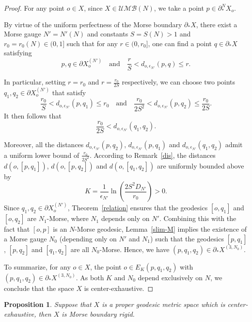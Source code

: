 \documentclass[a4paper,11pt,oneside]{article}
\newtheorem{Proposition}[Theorem]{Proposition}
\begin{document}
\begin{proof}

For any point $o\in X$, since $X\in\mathcal{UMB}(N)$, we take a point $p\in \partial_*^{N}X_o$.

By virtue of the uniform perfectness of the Morse boundary $\partial_* X$, there exist a Morse gauge $N'=N'(N)$ and constants $S=S(N)> 1$ and $r_0=r_0(N)\in (0, 1]$ such that for any $r\in (0, r_0]$, one can find a point $q\in \partial_* X$ satisfying
\[
p, q\in \partial X^{(N')}_o \quad \text{and} \quad \frac{r}{S}<d_{o,\epsilon_{N'}}(p,q)\le r.
\]

In particular, setting $r=r_0$ and $\displaystyle r=\frac{r_0}{2S}$ respectively, we can choose two points $q_1, q_2\in \partial X^{(N')}_o$ that satisfy
\[
\frac{r_0}{S}<d_{o,\epsilon_{N'}}(p,q_1)\le r_0\quad\text{and}\quad
\frac{r_0}{2S^2}<d_{o,\epsilon_{N'}}(p,q_2)\le \frac{r_0}{2S}.
\]
It then follows that
\[
\frac{r_0}{2S}<d_{o,\epsilon_{N'}}(q_1,q_2).
\]

Moreover, all the distances $d_{o,\epsilon_{N'}}(p,q_2)$, $d_{o,\epsilon_{N'}}(p,q_1)$ and $d_{o,\epsilon_{N'}}(q_1,q_2)$ admit a uniform lower bound of $\displaystyle\frac{r_0}{2S^2}$.
According to Remark~\ref{dis}, the distances $d(o, [p, q_1])$, $d(o, [p, q_2])$ and $d(o, [q_1, q_2])$ are uniformly bounded above by
\[
K=\frac{1}{\epsilon_{N'}}\ln\left(\frac{2S^2D_{N'}}{r_0}\right)>0.
\]
Since $q_1, q_2\in \partial X_o^{(N')}$, Theorem~\ref{relation} ensures that the geodesics $[o, q_1]$ and $[o, q_2]$ are $N_1$-Morse, where $N_1$ depends only on $N'$. 
Combining this with the fact that $[o, p]$ is an $N$-Morse geodesic, 
Lemma~\ref{slim-M} implies the existence of a Morse gauge $N_0$ (depending only on $N'$ and $N_1$) such that the geodesics $[p, q_1]$, $[p, q_2]$ and $[q_1, q_2]$ are all $N_0$-Morse. 
Hence, we have $(p, q_1, q_2)\in \partial_*X^{(3, N_0)}$.

To summarize, for any $o\in X$, the point $o\in E_{K}(p, q_1, q_2)$ with $(p, q_1,q_2)\in \partial_*X^{(3, N_0)}$. As both $K$ and $N_0$ depend exclusively on $N$, we conclude that the space $X$ is center-exhaustive.

\end{proof}

\begin{Proposition}
Suppose that $X$ is a proper geodesic metric space which is center-exhaustive, then $X$ is Morse boundary rigid.    
\end{Proposition}
\end{document}
